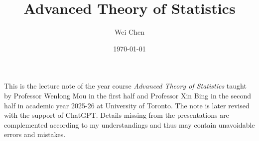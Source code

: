 \documentclass[12pt,oneside]{book}
\title{{\Large{\textbf{Advanced Theory of Statistics}}}}
\author{Wei Chen}
\date{\today}
\newcommand{\1}{\mathbbm{1}}
\theoremstyle{mystyle}{\newtheorem{de}{Definition}[section]}
\theoremstyle{mystyle}{\newtheorem{prop}[de]{Proposition}}
\theoremstyle{mystyle}{\newtheorem{thm}[de]{Theorem}}
\theoremstyle{mystyle}{\newtheorem{lem}[de]{Lemma}}
\theoremstyle{mystyle}{\newtheorem{cor}[de]{Corollary}}
\theoremstyle{mystyle}{\newtheorem*{remark}{Remark}}
\theoremstyle{mystyle}{\newtheorem*{eg}{Example}}
\theoremstyle{cstyle}{\newtheorem*{cthm}{}}
\theoremstyle{warn}
\begin{document}
	\maketitle
	\allowdisplaybreaks
	\setcounter{page}{1}
	\begin{center}
    \end{center}
    This is the lecture note of the year course \emph{Advanced Theory of Statistics} taught by Professor Wenlong Mou in the first half and Professor Xin Bing in the second half in academic year 2025-26 at University of Toronto. The note is later revised with the support of ChatGPT. Details missing from the presentations are complemented according to my understandings and thus may contain unavoidable errors and mistakes.
    
    
	\tableofcontents
	\clearpage
    
    
    
    
    
    
\end{document}

